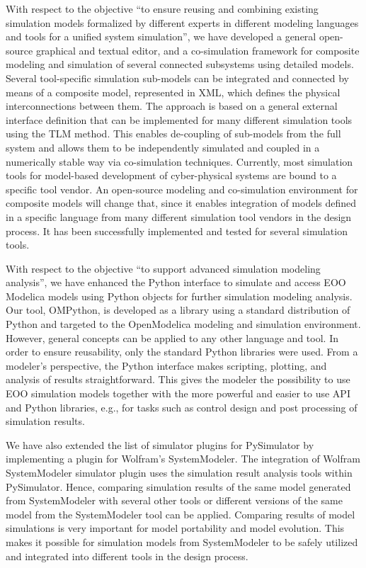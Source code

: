 With respect to the objective “to ensure reusing and combining existing simulation models formalized by different experts in different modeling languages and tools for a unified system simulation”, we have developed a general open-source graphical and textual editor, and a co-simulation framework for composite modeling and simulation of several connected subsystems using detailed models. Several tool-specific simulation sub-models can be integrated and connected by means of a composite model, represented in XML, which defines the physical interconnections between them. The approach is based on a general external interface definition that can be implemented for many different simulation tools using the TLM method. This enables de-coupling of sub-models from the full system and allows them to be independently simulated and coupled in a numerically stable way via co-simulation techniques. Currently, most simulation tools for model-based development of cyber-physical systems are bound to a specific tool vendor. An open-source modeling and co-simulation environment for composite models will change that, since it enables integration of models defined in a specific language from many different simulation tool vendors in the design process. It has been successfully implemented and tested for several simulation tools. 

With respect to the objective “to support advanced simulation modeling analysis”, we have enhanced the Python interface to simulate and access EOO Modelica models using Python objects for further simulation modeling analysis. Our tool, OMPython, is developed as a library using a standard distribution of Python and targeted to the OpenModelica modeling and simulation environment. However, general concepts can be applied to any other language and tool. In order to ensure reusability, only the standard Python libraries were used. From a modeler’s perspective, the Python interface makes scripting, plotting, and analysis of results straightforward. This gives the modeler the possibility to use EOO simulation models together with the more powerful and easier to use API and Python libraries, e.g., for tasks such as control design and post processing of simulation results. 

We have also extended the list of simulator plugins for PySimulator by implementing a plugin for Wolfram’s SystemModeler. The integration of Wolfram SystemModeler simulator plugin uses the simulation result analysis tools within PySimulator. Hence, comparing simulation results of the same model generated from SystemModeler with several other tools or different versions of the same model from the SystemModeler tool can be applied. Comparing results of model simulations is very important for model portability and model evolution. This makes it possible for simulation models from SystemModeler to be safely utilized and integrated into different tools in the design process.

